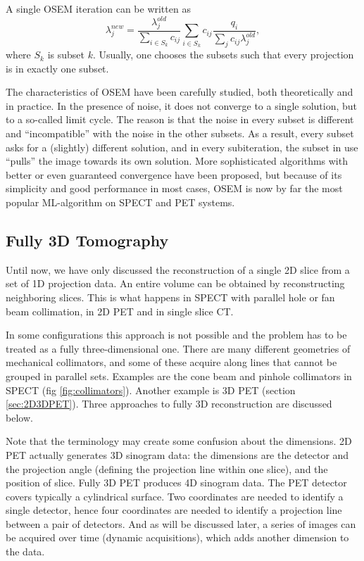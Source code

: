 \documentclass[11pt,oneside]{article}
\begin{document}
A single OSEM iteration can be written as
\begin{equation}
  \lambda_j^{new}  =  \frac{\lambda_j^{old}}{\sum_{i\in S_k} c_{ij}}
           \sum_{i\in S_k} c_{ij}  \frac{q_i}{\sum_j c_{ij} \lambda_j^{old}},
           \label{eq:osem}
\end{equation}
where $S_k$ is subset $k$. Usually, one chooses the subsets such that
every projection is in exactly one subset.

The characteristics of OSEM have been carefully studied, both
theoretically and in practice. In the presence of noise, it does not
converge to a single solution, but to a so-called limit cycle. The
reason is that the noise in every subset is different and
``incompatible'' with the noise in the other subsets. As a result,
every subset asks for a (slightly) different solution, and in every
subiteration, the subset in use ``pulls'' the image towards its own
solution. More sophisticated algorithms with better or even guaranteed
convergence have been proposed, but because of its simplicity and good
performance in most cases, OSEM is now by far the most popular
ML-algorithm on SPECT and PET systems.



\subsection{Fully 3D Tomography}
Until now, we have only discussed the reconstruction of a single 2D slice from
a set of 1D projection data. An entire volume can be obtained by
reconstructing neighboring slices.  This is what happens in SPECT with
parallel hole or fan beam collimation, in 2D PET and in single slice CT.

In some configurations this approach is not possible and the problem
has to be treated as a fully three-dimensional one. There are many
different geometries of mechanical collimators, and some of these
acquire along lines that cannot be grouped in parallel sets. Examples
are the cone beam and pinhole collimators in SPECT (fig
\ref{fig:collimators}). Another example is 3D PET (section
\ref{sec:2D3DPET}). Three approaches to fully 3D reconstruction are
discussed below.

Note that the terminology may create some confusion about the
dimensions. 2D PET actually generates 3D sinogram data: the dimensions
are the detector and the projection angle (defining the projection
line within one slice), and the position of slice. Fully 3D PET
produces 4D sinogram data. The PET detector covers typically a
cylindrical surface. Two coordinates are needed to identify a single
detector, hence four coordinates are needed to identify a projection
line between a pair of detectors. And as will be discussed later, a series
of images can be acquired over time (dynamic acquisitions), which adds
another dimension to the data.
\end{document}
